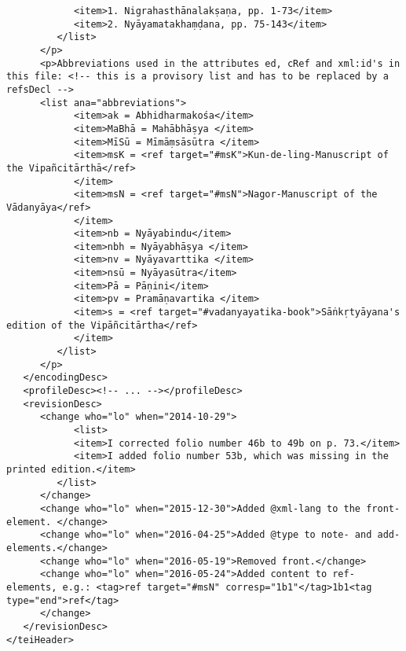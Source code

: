 \documentclass[article,12pt,a4paper]{memoir}%
\begin{document}
\begin{verbatim}
            <item>1. Nigrahasthānalakṣaṇa, pp. 1-73</item>
            <item>2. Nyāyamatakhaṃḍana, pp. 75-143</item>
         </list>
      </p>
      <p>Abbreviations used in the attributes ed, cRef and xml:id's in this file: <!-- this is a provisory list and has to be replaced by a refsDecl -->
      <list ana="abbreviations">
            <item>ak = Abhidharmakośa</item>
            <item>MaBhā = Mahābhāṣya </item>
            <item>MīSū = Mīmāṃsāsūtra </item>
            <item>msK = <ref target="#msK">Kun-de-ling-Manuscript of the Vipañcitārthā</ref>
            </item>
            <item>msN = <ref target="#msN">Nagor-Manuscript of the Vādanyāya</ref>
            </item>
            <item>nb = Nyāyabindu</item>
            <item>nbh = Nyāyabhāṣya </item>
            <item>nv = Nyāyavarttika </item>
            <item>nsū = Nyāyasūtra</item>
            <item>Pā = Pāṇini</item>
            <item>pv = Pramāṇavartika </item>
            <item>s = <ref target="#vadanyayatika-book">Sāṅkṛtyāyana's edition of the Vipāñcitārtha</ref>
            </item>
         </list>
      </p>
   </encodingDesc>
   <profileDesc><!-- ... --></profileDesc>
   <revisionDesc>
      <change who="lo" when="2014-10-29">
	        <list>
            <item>I corrected folio number 46b to 49b on p. 73.</item>
            <item>I added folio number 53b, which was missing in the printed edition.</item>
         </list>
      </change>
      <change who="lo" when="2015-12-30">Added @xml-lang to the front-element. </change>
      <change who="lo" when="2016-04-25">Added @type to note- and add-elements.</change>
      <change who="lo" when="2016-05-19">Removed front.</change>
      <change who="lo" when="2016-05-24">Added content to ref-elements, e.g.: <tag>ref target="#msN" corresp="1b1"</tag>1b1<tag type="end">ref</tag>
      </change>
   </revisionDesc>
</teiHeader>
	 \end{verbatim}
       
      \clearpage
      \begin{english}
      \printshorthands
      \printbibliography
      \end{english}
    
\end{document}
